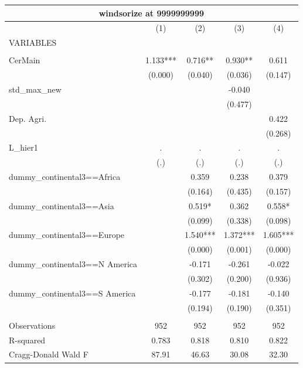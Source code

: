 \begin{tabular}{lcccc}
\multicolumn{5}{c}{windsorize at 9999999999} \\ \hline
 & (1) & (2) & (3) & (4) \\
VARIABLES &  &  &  &  \\ \hline
 &  &  &  &  \\
CerMain & 1.133*** & 0.716** & 0.930** & 0.611 \\
 & (0.000) & (0.040) & (0.036) & (0.147) \\
std\_max\_new &  &  & -0.040 &  \\
 &  &  & (0.477) &  \\
Dep. Agri. &  &  &  & 0.422 \\
 &  &  &  & (0.268) \\
L\_hier1 & . & . & . & . \\
 & (.) & (.) & (.) & (.) \\
dummy\_continental3==Africa &  & 0.359 & 0.238 & 0.379 \\
 &  & (0.164) & (0.435) & (0.157) \\
dummy\_continental3==Asia &  & 0.519* & 0.362 & 0.558* \\
 &  & (0.099) & (0.338) & (0.098) \\
dummy\_continental3==Europe &  & 1.540*** & 1.372*** & 1.605*** \\
 &  & (0.000) & (0.001) & (0.000) \\
dummy\_continental3==N America &  & -0.171 & -0.261 & -0.022 \\
 &  & (0.302) & (0.200) & (0.936) \\
dummy\_continental3==S America &  & -0.177 & -0.181 & -0.140 \\
 &  & (0.194) & (0.190) & (0.351) \\
 &  &  &  &  \\
Observations & 952 & 952 & 952 & 952 \\
R-squared & 0.783 & 0.818 & 0.810 & 0.822 \\
 Cragg-Donald Wald F & 87.91 & 46.63 & 30.08 & 32.30 \\ \hline
\end{tabular}
